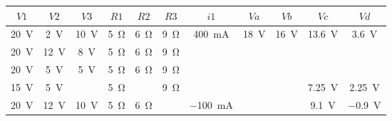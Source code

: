 \documentclass{article}
\begin{document}
\begin{enumerate}[label=\textbf{A.\arabic*}]
\begin{tabular}{|c|c|c|c|c|c|c|c|c|c|c|}
	\hline
	\rowcolor{headergray}
	${V1}$&${V2}$&${V3}$&$ {R1} $&${R2} $&$ {R3}$&$ {{i}1}$&$ {Va}  $&$ {Vb}$&$ {Vc}$&$ {Vd}$ \\ \hline
	\SI{20}{\volt}&\SI{2}{\volt}&\SI{10}{\volt}&\SI{5}{\ohm}&\SI{6}{\ohm}&\SI{9}{\ohm}&\SI{400}{\milli\ampere}&\SI{18}{\volt}&\SI{16}{\volt}&\SI{13,6}{\volt}&\SI{3,6}{\volt} \\ \hline
	\SI{20}{\volt}&\SI{12}{\volt}&\SI{8}{\volt}&\SI{5}{\ohm}&\SI{6}{\ohm}&\SI{9}{\ohm}&&&&&\\ \hline
	\SI{20}{\volt}&\SI{5}{\volt}&\SI{5}{\volt}&\SI{5}{\ohm}&\SI{6}{\ohm}&\SI{9}{\ohm}&&&&&\\ \hline
	\SI{15}{\volt}&\SI{5}{\volt}&&\SI{5}{\ohm}&&\SI{9}{\ohm}&&&&\SI{7,25}{\volt}&\SI{2,25}{\volt}\\ \hline
\SI{20}{\volt}&\SI{12}{\volt}&\SI{10}{\volt}&\SI{5}{\ohm}&\SI{6}{\ohm}&&\SI{-100}{\milli\ampere}&&&\SI{9,1}{\volt}&\SI{-0,9}{\volt} \\ \hline
	
	
\end{tabular}\\

\begin{minipage}{.45\textwidth}
	

\end{minipage}
\end{enumerate}
\end{document}
